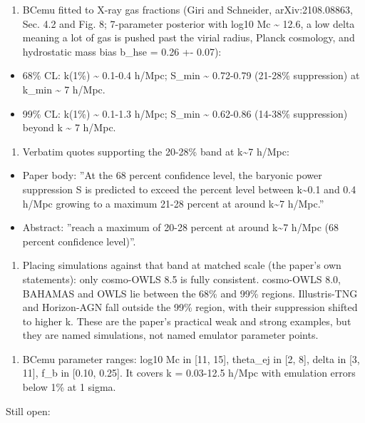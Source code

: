 \documentclass[11pt,a4paper]{article}
\begin{document}
\begin{enumerate}
  \item BCemu fitted to X-ray gas fractions (Giri and Schneider, arXiv:2108.08863, Sec. 4.2 and Fig. 8; 7-parameter posterior with log10 Mc \textasciitilde{} 12.6, a low delta meaning a lot of gas is pushed past the virial radius, Planck cosmology, and hydrostatic mass bias b\_hse = 0.26 +- 0.07):
\end{enumerate}
\begin{itemize}
  \item 68\% CL: k(1\%) \textasciitilde{} 0.1-0.4 h/Mpc; S\_min \textasciitilde{} 0.72-0.79 (21-28\% suppression) at k\_min \textasciitilde{} 7 h/Mpc.
  \item 99\% CL: k(1\%) \textasciitilde{} 0.1-1.3 h/Mpc; S\_min \textasciitilde{} 0.62-0.86 (14-38\% suppression) beyond k \textasciitilde{} 7 h/Mpc.
\end{itemize}
\begin{enumerate}
  \item Verbatim quotes supporting the 20-28\% band at k\textasciitilde{}7 h/Mpc:
\end{enumerate}
\begin{itemize}
  \item Paper body: ''At the 68 percent confidence level, the baryonic power suppression S is predicted to exceed the percent level between k\textasciitilde{}0.1 and 0.4 h/Mpc growing to a maximum 21-28 percent at around k\textasciitilde{}7 h/Mpc.''
  \item Abstract: ''reach a maximum of 20-28 percent at around k\textasciitilde{}7 h/Mpc (68 percent confidence level)''.
\end{itemize}
\begin{enumerate}
  \item Placing simulations against that band at matched scale (the paper's own statements): only cosmo-OWLS 8.5 is fully consistent. cosmo-OWLS 8.0, BAHAMAS and OWLS lie between the 68\% and 99\% regions. Illustris-TNG and Horizon-AGN fall outside the 99\% region, with their suppression shifted to higher k. These are the paper's practical weak and strong examples, but they are named simulations, not named emulator parameter points.
\end{enumerate}
\begin{enumerate}
  \item BCemu parameter ranges: log10 Mc in [11, 15], theta\_ej in [2, 8], delta in [3, 11], f\_b in [0.10, 0.25]. It covers k = 0.03-12.5 h/Mpc with emulation errors below 1\% at 1 sigma.
\end{enumerate}
Still open:
\end{document}
